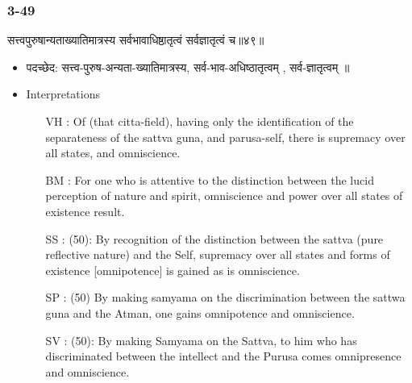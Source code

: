 \begin{frame}[fragile]\frametitle{3-49}
\begin{sanskrit}
सत्त्वपुरुषान्यताख्यातिमात्रस्य सर्वभावाधिष्ठातृत्वं सर्वज्ञातृत्वं च॥४९॥
\end{sanskrit}

	\begin{itemize}
	\item पदच्छेद:  सत्त्व-पुरुष-अन्यता-ख्यातिमात्रस्य, सर्व-भाव-अधिष्ठातृत्वम् , सर्व-ज्ञातृत्वम् ॥
	\item Interpretations
		\begin{itemize}	
		\item [VH]: Of (that citta-field), having only the identification of the separateness of the sattva guna, and parusa-self, there is supremacy over all states, and omniscience.
		\item [BM]: For one who is attentive to the distinction between the lucid perception of nature and spirit, omniscience and power over all states of existence result.
		\item [SS]: (50): By recognition of the distinction between the sattva (pure reflective nature) and the Self, supremacy over all states and forms of existence [omnipotence] is gained as is omniscience.
		\item [SP]: (50) By making samyama on the discrimination between the sattwa guna and the Atman, one gains omnipotence and omniscience.
		\item [SV]: (50): By making Samyama on the Sattva, to him who has discriminated between the intellect and the Purusa comes omnipresence and omniscience. 
		\end{itemize}
	\end{itemize}
\end{frame}

